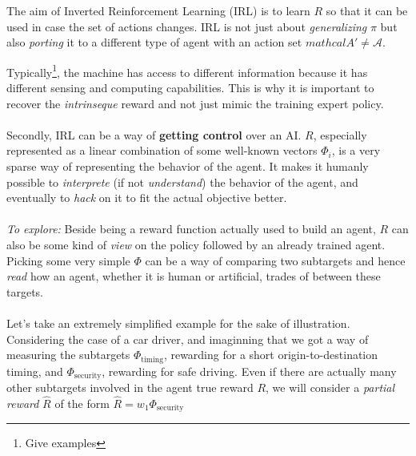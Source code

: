 \documentclass{article}
\begin{document}
The aim of Inverted Reinforcement Learning (IRL) is to learn $R$ so that it can be used in case the set of actions changes. IRL is not just about \emph{generalizing} $\pi$ but also \emph{porting} it to a different type of agent with an action set $mathcal A' \neq \mathcal A$. %

Typically\footnote{Give examples}, the machine has access to different information because it has different sensing and computing capabilities. This is why it is important to recover the \emph{intrinseque} reward and not just mimic the training expert policy.

\paragraph{}
Secondly, IRL can be a way of \textbf{getting control} over an AI. $R$, especially represented as a linear combination of some well-known vectors $\Phi_i$, is a very sparse way of representing the behavior of the agent. It makes it humanly possible to \emph{interprete} (if not \emph{understand}) the behavior of the agent, and eventually to \emph{hack} on it to fit the actual objective better.

\paragraph{}
\emph{To explore:} Beside being a reward function actually used to build an agent, $R$ can also be some kind of \emph{view} on the policy followed by an already trained agent. Picking some very simple $\Phi$ can be a way of comparing two subtargets and hence \emph{read} how an agent, whether it is human or artificial, trades of between these targets.

\paragraph{}
Let's take an extremely simplified example for the sake of illustration. Considering the case of a car driver, and imaginning that we got a way of measuring the subtargets $\Phi_{\text{timing}}$, rewarding for a short origin-to-destination timing, and $\Phi_{\text{security}}$, rewarding for safe driving. Even if there are actually many other subtargets involved in the agent true reward $R$, we will consider a \emph{partial reward} $\hat R$ of the form $\hat R = w_1 \Phi_{\text{security}}$



\end{document}
